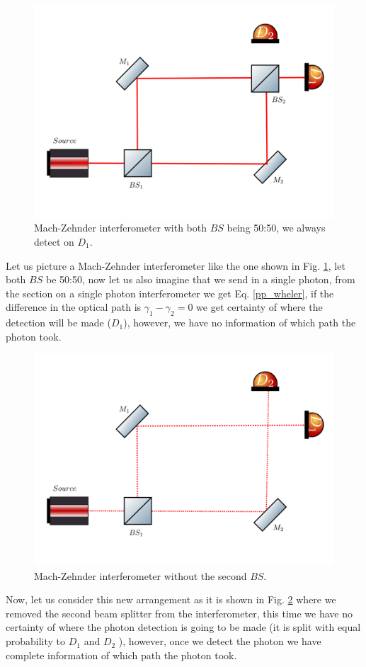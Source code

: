 \documentclass{book}
\begin{document}
\begin{figure}[H]
\centering
\includegraphics[width=\linewidth,height=6.5 cm]{images/wheeler1.png}
\caption{Mach-Zehnder interferometer with both $BS$ being 50:50, we always detect on $D_{1}$.}
\label{wheeler1}
\end{figure}

Let us picture a Mach-Zehnder interferometer like the one shown in Fig. \ref{wheeler1}, let both $BS$ be 50:50, now let us also imagine that we send in a single photon, from the section on a single photon interferometer we get Eq. \ref{pp_wheler}, if the difference in the optical path is $\gamma_{1}-\gamma_{2}=0$  we get certainty of where the detection will be made ($D_{1}$), however, we have no information of which path the photon took.

\begin{figure}[H]
\centering
\includegraphics[width=\linewidth,height=6.5 cm]{images/wheeler2.png}
\caption{Mach-Zehnder interferometer without the second $BS$.}
\label{wheeler2}
\end{figure}

Now, let us consider this new arrangement as it is shown in Fig. \ref{wheeler2} where we removed the second beam splitter from the interferometer, this time we have no certainty of where the photon detection is going to be made (it is split with equal probability to $D_{1}$ and $D_{2}$ ), however, once we detect the photon we have complete information of which path the photon took.
\end{document}
